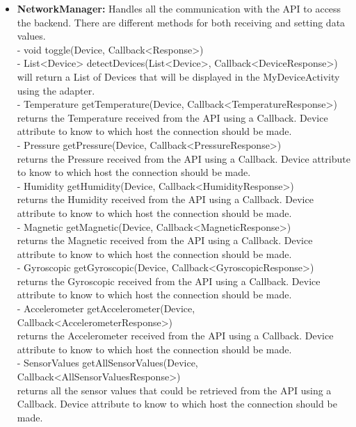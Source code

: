 \documentclass[a4paper]{article}
\begin{document}
\begin{itemize}
		\item{\textbf{NetworkManager:}} 
		Handles all the communication with the API to access the backend. There are different methods for both receiving and setting data values.\\
        - void toggle(Device, Callback<Response>)\\
        - List<Device> detectDevices(List<Device>, Callback<DeviceResponse>) will return a List of Devices that will be displayed in the MyDeviceActivity using the adapter.\\
        - Temperature getTemperature(Device, Callback<TemperatureResponse>)\\ returns the Temperature received from the API using a Callback. Device attribute to know to which host the connection should be made.\\
        - Pressure getPressure(Device, Callback<PressureResponse>)\\ returns the Pressure received from the API using a Callback. Device attribute to know to which host the connection should be made.\\
        - Humidity getHumidity(Device, Callback<HumidityResponse>)\\ 
        returns the Humidity received from the API using a Callback. Device attribute to know to which host the connection should be made.\\
        - Magnetic getMagnetic(Device, Callback<MagneticResponse>)\\ returns the Magnetic received from the API using a Callback. Device attribute to know to which host the connection should be made.\\
        - Gyroscopic getGyroscopic(Device, Callback<GyroscopicResponse>)\\ returns the Gyroscopic received from the API using a Callback. Device attribute to know to which host the connection should be made.\\
        - Accelerometer getAccelerometer(Device, Callback<AccelerometerResponse>)\\ returns the Accelerometer received from the API using a Callback. Device attribute to know to which host the connection should be made.\\
        - SensorValues getAllSensorValues(Device, Callback<AllSensorValuesResponse>)\\ returns all the sensor values that could be retrieved from the API using a Callback. Device attribute to know to which host the connection should be made.\\

\end{itemize}
\end{document}
